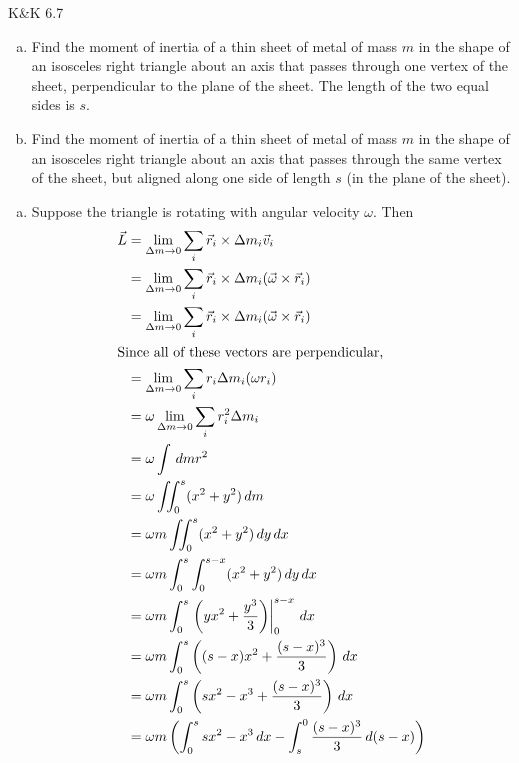 \documentclass{esg8012pset}
\renewcommand{\d}{\,d}
\begin{document}
\begin{problem}{K\&K 6.7}
  \begin{enumerate}[(a)]
    \item Find the moment of inertia of a thin sheet of metal of mass $m$ in the shape of an isosceles right triangle about an axis that passes through one vertex of the sheet, perpendicular to the plane of the sheet. The length of the two equal sides is $s$.
    \item Find the moment of inertia of a thin sheet of metal of mass $m$ in the shape of an isosceles right triangle about an axis that passes through the same vertex of the sheet, but aligned along one side of length $s$ (in the plane of the sheet).
  \end{enumerate}
\end{problem}
\begin{solution}
  \begin{enumerate}[(a)]
    \item Suppose the triangle is rotating with angular velocity $\omega$.  Then \begin{align*}
      \vec L & = \lim_{\Delta m\to 0} \sum_{i} \vec r_i \times \Delta m_i \vec v_i \\
      & = \lim_{\Delta m\to 0} \sum_{i} \vec r_i \times \Delta m_i (\vec \omega \times \vec r_i) \\
      & = \lim_{\Delta m\to 0} \sum_{i} \vec r_i \times \Delta m_i (\vec \omega \times \vec r_i) \\
    \intertext{Since all of these vectors are perpendicular,}
      & = \lim_{\Delta m\to 0} \sum_{i} r_i \Delta m_i (\omega r_i) \\
      & = \omega \lim_{\Delta m\to 0} \sum_{i} r_i^2 \Delta m_i \\
      & = \omega \int \d m r^2 \\
      & = \omega \iint_0^s (x^2 + y^2)\d m \\
      & = \omega m \iint_0^s (x^2 + y^2)\d y\d x \\
      & = \omega m \int_0^s \int_0^{s-x} (x^2 + y^2)\d y\d x \\
      & = \omega m \int_0^s \left.\left(y x^2 + \frac{y^3}{3}\right)\right|_0^{s-x} \d x \\
      & = \omega m \int_0^s \left((s-x)x^2 + \frac{(s-x)^3}{3}\right) \d x \\
      & = \omega m \int_0^s \left(sx^2 - x^3 + \frac{(s-x)^3}{3}\right) \d x \\
      & = \omega m \left( \int_0^s sx^2 - x^3 \d x - \int_s^0 \frac{(s-x)^3}{3} \d (s-x) \right) \\

\end{align*}
\end{enumerate}
\end{solution}
\end{document}
